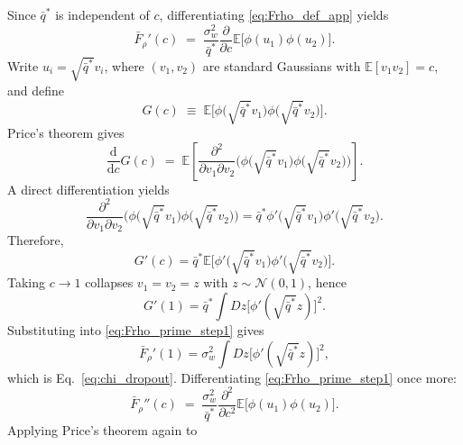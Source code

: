 \documentclass{article}
\theoremstyle{plain}
\theoremstyle{definition}
\theoremstyle{remark}
\begin{document}
Since \(\bar q^*\) is independent of \(c\), differentiating \eqref{eq:Frho_def_app} yields
\relax
\begin{equation}
\bar F_\rho'(c) \;=\; \frac{\sigma_w^2}{\bar q^*} \frac{\partial}{\partial c} \mathbb E\big[\phi(u_1)\phi(u_2)\big].
\label{eq:Frho_prime_step1}
\end{equation}
\relax
Write \(u_i=\sqrt{\bar q^*} v_i\), where \((v_1,v_2)\) are standard Gaussians with \(\mathbb E[v_1v_2]=c\), and define
\relax
\begin{equation}
G(c)\;\equiv\;\mathbb E\Big[\phi\big(\sqrt{\bar q^*} v_1\big) \phi\big(\sqrt{\bar q^*} v_2\big)\Big].
\end{equation}
\relax
Price's theorem \cite{Price1958GaussianInputs} gives
\relax
\begin{equation}
\frac{\mathrm d}{\mathrm dc}G(c) \;=\; \mathbb E\left[ \frac{\partial^2}{\partial v_1 \partial v_2} \Big( \phi\big(\sqrt{\bar q^*} v_1\big) \phi\big(\sqrt{\bar q^*} v_2\big) \Big) \right].
\label{eq:price_step}
\end{equation}
\relax
A direct differentiation yields
\relax
\begin{equation}
\frac{\partial^2}{\partial v_1 \partial v_2} \Big( \phi\big(\sqrt{\bar q^*} v_1\big) \phi\big(\sqrt{\bar q^*} v_2\big) \Big) = \bar q^* \phi'\big(\sqrt{\bar q^*} v_1\big) \phi'\big(\sqrt{\bar q^*} v_2\big).
\end{equation}
\relax
Therefore,
\relax
\begin{equation}
G'(c) = \bar q^* \mathbb E\Big[ \phi'\big(\sqrt{\bar q^*} v_1\big) \phi'\big(\sqrt{\bar q^*} v_2\big) \Big].
\end{equation}
\relax
Taking \(c\to 1\) collapses \(v_1=v_2=z\) with \(z\sim\mathcal N(0,1)\), hence
\relax
\begin{equation}
G'(1) = \bar q^*\int Dz \big[\phi'(\sqrt{\bar q^*} z)\big]^2.
\end{equation}
\relax
Substituting into \eqref{eq:Frho_prime_step1} gives
\relax
\begin{equation}
\bar F_\rho'(1) = \sigma_w^2\int Dz \big[\phi'(\sqrt{\bar q^*} z)\big]^2,
\end{equation}
\relax
which is Eq.~\eqref{eq:chi_dropout}. Differentiating \eqref{eq:Frho_prime_step1} once more:
\relax
\begin{equation}
\bar F_\rho''(c) \;=\; \frac{\sigma_w^2}{\bar q^*} \frac{\partial^2}{\partial c^2} \mathbb E\big[\phi(u_1)\phi(u_2)\big].
\label{eq:Frho_second_step1}
\end{equation}
\relax
Applying Price's theorem again to
\end{document}
